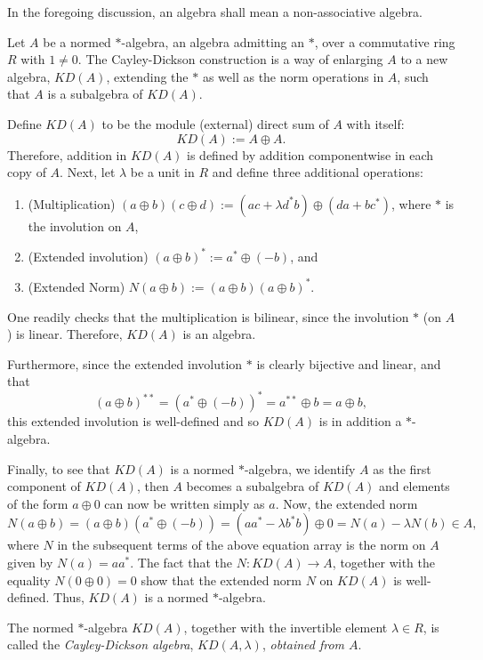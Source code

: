 \documentclass[12pt]{article}
\begin{document}

In the foregoing discussion, an algebra shall mean a non-associative algebra.

Let $A$ be a normed $*$-algebra, an algebra admitting an  $*$, over a commutative ring $R$ with $1\neq0$.  The Cayley-Dickson construction is a way of enlarging $A$ to a new algebra, $KD(A)$, extending the $*$ as well as the norm operations in $A$, such that $A$ is a subalgebra of $KD(A)$.  

Define $KD(A)$ to be the module (external) direct sum of $A$ with itself: $$KD(A):=A\oplus A.$$  Therefore, addition in $KD(A)$ is defined by addition componentwise in each copy of $A$.  Next, let $\lambda$ be a unit in $R$ and define three additional operations: 
\begin{enumerate} 
\item (Multiplication) $(a\oplus b)(c\oplus d):=(ac+\lambda d^*b)\oplus(da+bc^*)$, where $*$ is the involution on $A$, 
\item (Extended involution) $(a\oplus b)^*:=a^*\oplus(-b)$, and 
\item (Extended Norm) $N(a\oplus b):=(a\oplus b)(a\oplus b)^*$.
\end{enumerate} 
One readily checks that the multiplication is bilinear, since the involution $*$ (on $A$) is linear.  Therefore, $KD(A)$ is an algebra.  

Furthermore, since the extended involution $*$ is clearly bijective and linear, and that $${(a\oplus b)}^{**}=(a^*\oplus(-b))^*=a^{**}\oplus b=a\oplus b,$$ this extended involution is well-defined and so $KD(A)$ is in addition a $*$-algebra.  

Finally, to see that $KD(A)$ is a normed $*$-algebra, we identify $A$ as the first component of $KD(A)$, then $A$ becomes a subalgebra of $KD(A)$ and elements of the form $a\oplus0$ can now be written simply as $a$.  Now, the extended norm $$N(a\oplus b)=(a\oplus b)(a^*\oplus(-b))=(aa^*-\lambda b^*b)\oplus0=N(a)-\lambda N(b)\in A,$$ where $N$ in the subsequent terms of the above equation array is the norm on $A$ given by $N(a)=aa^*$.  The fact that the $N\colon KD(A)\to A$, together with the equality $N(0\oplus0)=0$ show that the extended norm $N$ on $KD(A)$ is well-defined.  Thus, $KD(A)$ is a normed $*$-algebra. 

The normed $*$-algebra $KD(A)$, together with the invertible element $\lambda\in R$, is called the \emph{Cayley-Dickson algebra}, $KD(A,\lambda)$, \emph{obtained from $A$}.
\end{document}
